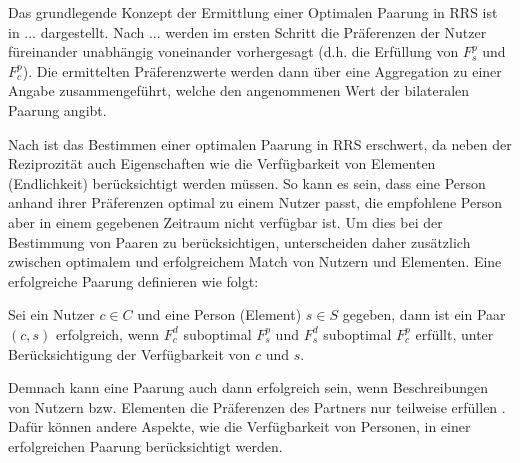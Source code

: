 Das grundlegende Konzept der Ermittlung einer Optimalen Paarung in \ac{RRS} ist in ... dargestellt.
Nach ... werden im ersten Schritt die Präferenzen der Nutzer füreinander unabhängig voneinander vorhergesagt (d.h. die Erfüllung von $F_{s}^{p}$ und $F_{c}^{p}$).
Die ermittelten Präferenzwerte werden dann über eine Aggregation zu einer Angabe zusammengeführt, welche den angenommenen Wert der bilateralen Paarung angibt.

Nach \textcite[S. 36]{li:inproceedings} ist das Bestimmen einer optimalen Paarung in \ac{RRS} erschwert, da neben der Reziprozität auch Eigenschaften wie die Verfügbarkeit von Elementen (Endlichkeit) berücksichtigt werden müssen.
So kann es sein, dass eine Person anhand ihrer Präferenzen optimal zu einem Nutzer passt, die empfohlene Person aber in einem gegebenen Zeitraum nicht verfügbar ist.
Um dies bei der Bestimmung von Paaren zu berücksichtigen, unterscheiden \textcite[S. 37]{li:inproceedings} daher zusätzlich zwischen optimalem und erfolgreichem Match von Nutzern und Elementen.
Eine erfolgreiche Paarung definieren \textcite[S. 37]{li:inproceedings} wie folgt:

\begin{definition}\label{def:2}
    Sei ein Nutzer $c \in C$ und eine Person (Element) $s \in S$ gegeben, dann ist ein Paar $(c,s)$ erfolgreich, wenn $F_{c}^{d}$ suboptimal $F_{s}^{p}$ und $F_{s}^{d}$ suboptimal $F_{c}^{p}$ erfüllt, unter Berücksichtigung der Verfügbarkeit von $c$ und $s$.
\end{definition}

Demnach kann eine Paarung auch dann erfolgreich sein, wenn Beschreibungen von Nutzern bzw. Elementen die Präferenzen des Partners nur teilweise erfüllen \cite[S. 37]{li:inproceedings}.
Dafür können andere Aspekte, wie die Verfügbarkeit von Personen, in einer erfolgreichen Paarung berücksichtigt werden.

